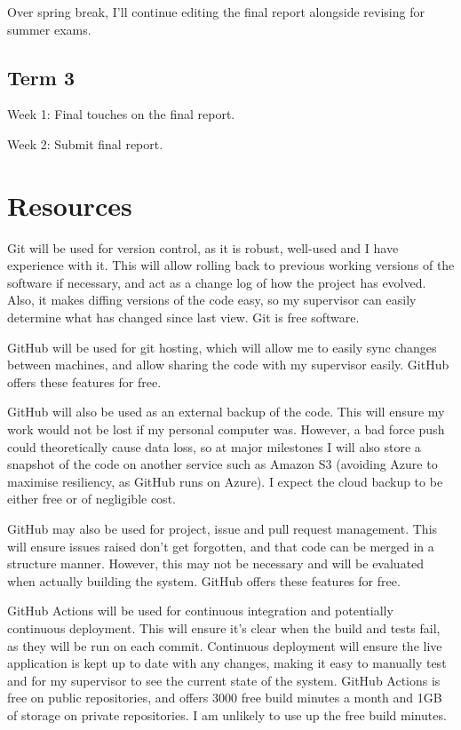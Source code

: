 \documentclass[12pt]{article}
\begin{document}
Over spring break, I’ll continue editing the final report alongside revising for summer exams.

\subsection{Term 3}

Week 1: Final touches on the final report.

Week 2: Submit final report.

\section{Resources}

Git will be used for version control, as it is robust, well-used and I have experience with it. This will allow rolling back to previous working versions of the software if necessary, and act as a change log of how the project has evolved. Also, it makes diffing versions of the code easy, so my supervisor can easily determine what has changed since last view. Git is free software.

GitHub will be used for git hosting, which will allow me to easily sync changes between machines, and allow sharing the code with my supervisor easily. GitHub offers these features for free.

GitHub will also be used as an external backup of the code. This will ensure my work would not be lost if my personal computer was. However, a bad force push could theoretically cause data loss, so at major milestones I will also store a snapshot of the code on another service such as Amazon S3 (avoiding Azure to maximise resiliency, as GitHub runs on Azure). I expect the cloud backup to be either free or of negligible cost.

GitHub may also be used for project, issue and pull request management. This will ensure issues raised don’t get forgotten, and that code can be merged in a structure manner. However, this may not be necessary and will be evaluated when actually building the system. GitHub offers these features for free.

GitHub Actions will be used for continuous integration and potentially continuous deployment. This will ensure it’s clear when the build and tests fail, as they will be run on each commit. Continuous deployment will ensure the live application is kept up to date with any changes, making it easy to manually test and for my supervisor to see the current state of the system. GitHub Actions is free on public repositories, and offers 3000 free build minutes a month and 1GB of storage on private repositories. I am unlikely to use up the free build minutes.
\end{document}
